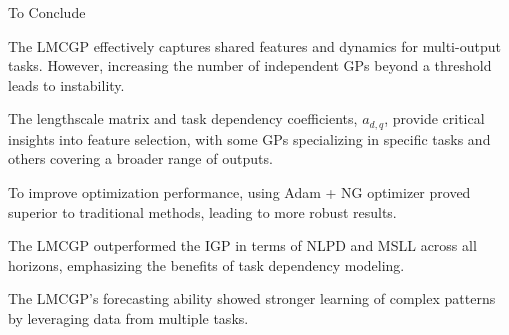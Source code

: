\begin{frame}{To Conclude}
		\justifying
		\begin{block}{}
		The LMCGP effectively captures shared features and dynamics for multi-output tasks. However, increasing the number of independent GPs beyond a threshold leads to instability.
		\end{block}
		
		\begin{block}{}
		The lengthscale matrix and task dependency coefficients, $a_{d,q}$, provide critical insights into feature selection, with some GPs specializing in specific tasks and others covering a broader range of outputs.
		\end{block}
		
		\begin{block}{}
		To improve optimization performance, using Adam + NG optimizer proved superior to traditional methods, leading to more robust results.
		\end{block}
		
		\begin{block}{}
		The LMCGP outperformed the IGP in terms of NLPD and MSLL across all horizons, emphasizing the benefits of task dependency modeling.
		\end{block}
		
		\begin{block}{}
		The LMCGP's forecasting ability showed stronger learning of complex patterns by leveraging data from multiple tasks.
		\end{block}
\end{frame}
